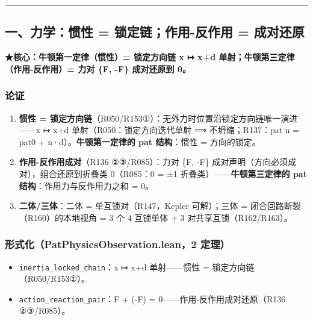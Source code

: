 \documentclass[
]{article}
\providecommand{\tightlist}{%
  \setlength{\itemsep}{0pt}\setlength{\parskip}{0pt}}
\begin{document}
\begin{center}\rule{0.5\linewidth}{0.5pt}\end{center}

\subsection{一、力学：惯性 = 锁定链；作用-反作用 =
成对还原}\label{ux4e00ux529bux5b66ux60efux6027-ux9501ux5b9aux94feux4f5cux7528-ux53cdux4f5cux7528-ux6210ux5bf9ux8fd8ux539f}

\textbf{★核心：牛顿第一定律（惯性）= 锁定方向链 x ↦ x+d
单射；牛顿第三定律（作用-反作用）= 力对 \{F, -F\} 成对还原到 0。}

\subsubsection{论证}\label{ux8bbaux8bc1}

\begin{enumerate}
\def\labelenumi{\arabic{enumi}.}
\tightlist
\item
  \textbf{惯性 =
  锁定方向链}（R050/R153①）：无外力时位置沿锁定方向链唯一演进------x ↦
  x+d 单射（R050：锁定方向迭代单射 ⟹ 不坍缩；R137：pat n = pat0 +
  n·d）。\textbf{牛顿第一定律的 pat 结构}：惯性 = 方向的锁定。
\item
  \textbf{作用-反作用成对}（R136 ②③/R085）：力对 \{F, -F\}
  成对声明（方向必须成对），组合还原到折叠类 0（R085：0 = ±1
  折叠类）------\textbf{牛顿第三定律的 pat 结构}：作用力与反作用力之和 =
  0。
\item
  \textbf{二体/三体}：二体 = 单互锁对（R147，Kepler 可解）；三体 =
  闭合回路断裂（R160）的本地视角 = 3 个 4 互锁单体 + 3
  对共享互锁（R162/R163）。
\end{enumerate}

\subsubsection{形式化（PatPhysicsObservation.lean，2
定理）}\label{ux5f62ux5f0fux5316patphysicsobservation.lean2-ux5b9aux7406}

\begin{itemize}
\tightlist
\item
  \texttt{inertia\_locked\_chain}：x ↦ x+d 单射------惯性 =
  锁定方向链（R050/R153①）。
\item
  \texttt{action\_reaction\_pair}：F + (-F) =
  0------作用-反作用成对还原（R136 ②③/R085）。
\end{itemize}
\end{document}
